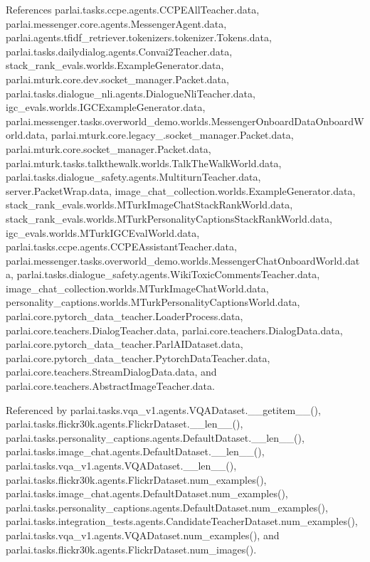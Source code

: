 References parlai.\+tasks.\+ccpe.\+agents.\+C\+C\+P\+E\+All\+Teacher.\+data, parlai.\+messenger.\+core.\+agents.\+Messenger\+Agent.\+data, parlai.\+agents.\+tfidf\+\_\+retriever.\+tokenizers.\+tokenizer.\+Tokens.\+data, parlai.\+tasks.\+dailydialog.\+agents.\+Convai2\+Teacher.\+data, stack\+\_\+rank\+\_\+evals.\+worlds.\+Example\+Generator.\+data, parlai.\+mturk.\+core.\+dev.\+socket\+\_\+manager.\+Packet.\+data, parlai.\+tasks.\+dialogue\+\_\+nli.\+agents.\+Dialogue\+Nli\+Teacher.\+data, igc\+\_\+evals.\+worlds.\+I\+G\+C\+Example\+Generator.\+data, parlai.\+messenger.\+tasks.\+overworld\+\_\+demo.\+worlds.\+Messenger\+Onboard\+Data\+Onboard\+World.\+data, parlai.\+mturk.\+core.\+legacy\+\_.\+socket\+\_\+manager.\+Packet.\+data, parlai.\+mturk.\+core.\+socket\+\_\+manager.\+Packet.\+data, parlai.\+mturk.\+tasks.\+talkthewalk.\+worlds.\+Talk\+The\+Walk\+World.\+data, parlai.\+tasks.\+dialogue\+\_\+safety.\+agents.\+Multiturn\+Teacher.\+data, server.\+Packet\+Wrap.\+data, image\+\_\+chat\+\_\+collection.\+worlds.\+Example\+Generator.\+data, stack\+\_\+rank\+\_\+evals.\+worlds.\+M\+Turk\+Image\+Chat\+Stack\+Rank\+World.\+data, stack\+\_\+rank\+\_\+evals.\+worlds.\+M\+Turk\+Personality\+Captions\+Stack\+Rank\+World.\+data, igc\+\_\+evals.\+worlds.\+M\+Turk\+I\+G\+C\+Eval\+World.\+data, parlai.\+tasks.\+ccpe.\+agents.\+C\+C\+P\+E\+Assistant\+Teacher.\+data, parlai.\+messenger.\+tasks.\+overworld\+\_\+demo.\+worlds.\+Messenger\+Chat\+Onboard\+World.\+data, parlai.\+tasks.\+dialogue\+\_\+safety.\+agents.\+Wiki\+Toxic\+Comments\+Teacher.\+data, image\+\_\+chat\+\_\+collection.\+worlds.\+M\+Turk\+Image\+Chat\+World.\+data, personality\+\_\+captions.\+worlds.\+M\+Turk\+Personality\+Captions\+World.\+data, parlai.\+core.\+pytorch\+\_\+data\+\_\+teacher.\+Loader\+Process.\+data, parlai.\+core.\+teachers.\+Dialog\+Teacher.\+data, parlai.\+core.\+teachers.\+Dialog\+Data.\+data, parlai.\+core.\+pytorch\+\_\+data\+\_\+teacher.\+Parl\+A\+I\+Dataset.\+data, parlai.\+core.\+pytorch\+\_\+data\+\_\+teacher.\+Pytorch\+Data\+Teacher.\+data, parlai.\+core.\+teachers.\+Stream\+Dialog\+Data.\+data, and parlai.\+core.\+teachers.\+Abstract\+Image\+Teacher.\+data.



Referenced by parlai.\+tasks.\+vqa\+\_\+v1.\+agents.\+V\+Q\+A\+Dataset.\+\_\+\+\_\+getitem\+\_\+\+\_\+(), parlai.\+tasks.\+flickr30k.\+agents.\+Flickr\+Dataset.\+\_\+\+\_\+len\+\_\+\+\_\+(), parlai.\+tasks.\+personality\+\_\+captions.\+agents.\+Default\+Dataset.\+\_\+\+\_\+len\+\_\+\+\_\+(), parlai.\+tasks.\+image\+\_\+chat.\+agents.\+Default\+Dataset.\+\_\+\+\_\+len\+\_\+\+\_\+(), parlai.\+tasks.\+vqa\+\_\+v1.\+agents.\+V\+Q\+A\+Dataset.\+\_\+\+\_\+len\+\_\+\+\_\+(), parlai.\+tasks.\+flickr30k.\+agents.\+Flickr\+Dataset.\+num\+\_\+examples(), parlai.\+tasks.\+image\+\_\+chat.\+agents.\+Default\+Dataset.\+num\+\_\+examples(), parlai.\+tasks.\+personality\+\_\+captions.\+agents.\+Default\+Dataset.\+num\+\_\+examples(), parlai.\+tasks.\+integration\+\_\+tests.\+agents.\+Candidate\+Teacher\+Dataset.\+num\+\_\+examples(), parlai.\+tasks.\+vqa\+\_\+v1.\+agents.\+V\+Q\+A\+Dataset.\+num\+\_\+examples(), and parlai.\+tasks.\+flickr30k.\+agents.\+Flickr\+Dataset.\+num\+\_\+images().

